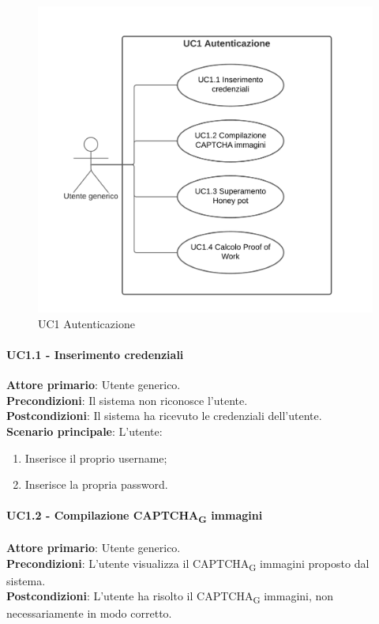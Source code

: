 \begin{figure}[H]
    \centering
    \includegraphics[scale=0.8]{img/Autenticazione.png}
    \caption{UC1 Autenticazione}
\end{figure}

\paragraph{UC1.1 - Inserimento credenziali}
\textbf{Attore primario}: Utente generico.\\
\textbf{Precondizioni}: Il sistema non riconosce l'utente.\\
\textbf{Postcondizioni}: Il sistema ha ricevuto le credenziali dell'utente.\\

\textbf{Scenario principale}: L'utente:
\begin{enumerate}
   \item Inserisce il proprio username;
   \item Inserisce la propria password.
\end{enumerate}

\paragraph{UC1.2 - Compilazione CAPTCHA\textsubscript{G} immagini}
\textbf{Attore primario}: Utente generico.\\
\textbf{Precondizioni}: L'utente visualizza il CAPTCHA\textsubscript{G} immagini proposto dal sistema.\\
\textbf{Postcondizioni}: L'utente ha risolto il CAPTCHA\textsubscript{G} immagini, non necessariamente in modo corretto.\\

